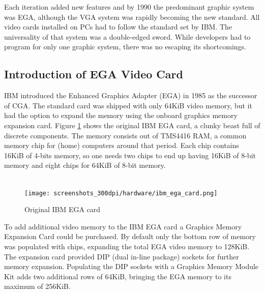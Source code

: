 \documentclass[book.tex]{subfiles}
\begin{document}
Each iteration added new features and by 1990 the predominant graphic system was EGA, although the VGA system was rapidly becoming the new standard. All video cards installed on PCs had to follow the standard set by IBM. The universality of that system was a double-edged sword. While developers had to program for only one graphic system, there was no escaping its shortcomings.\\


\subsection{Introduction of EGA Video Card}

IBM introduced the Enhanced Graphics Adapter (EGA) in 1985 as the successor of CGA. The standard card was shipped with only 64KiB video memory, but it had the option to expand the memory using the onboard graphics memory expansion card.
Figure \ref{fig:ibm_ega_card} shows the original IBM EGA card, a clunky beast full of discrete components. The memory consists out of TMS4416 RAM, a common memory chip for (home) computers around that period. Each chip contains 16KiB of 4-bits memory, so one needs two chips to end up having 16KiB of 8-bit memory and eight chips for 64KiB of 8-bit memory. \\

\\


\begin{figure}[H]
  \centering 
  \texttt{[image: screenshots\_300dpi/hardware/ibm\_ega\_card.png]} 
  \caption{Original IBM EGA card}
  \label{fig:ibm_ega_card}
\end{figure}

\par
To add additional video memory to the IBM EGA card a Graphics Memory Expansion Card could be purchased. By default only the bottom row of memory was populated with chips, expanding the total EGA video memory to 128KiB. The expansion card provided DIP (dual in-line package) sockets for further memory expansion. Populating the DIP sockets with a Graphics Memory Module Kit adds two additional rows of 64KiB, bringing the EGA memory to its maximum of 256KiB. \\
\end{document}
